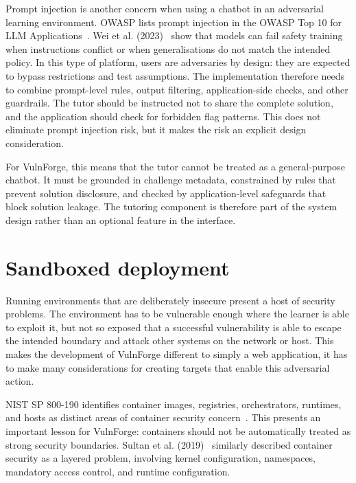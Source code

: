 Prompt injection is another concern when using a chatbot in an adversarial learning environment. OWASP lists prompt injection in the OWASP Top 10 for LLM Applications~\citep{editor_owasp_nodate}. Wei et al. (2023)~\citep{wei_jailbroken_2023} show that models can fail safety training when instructions conflict or when generalisations do not match the intended policy. In this type of platform, users are adversaries by design: they are expected to bypass restrictions and test assumptions. The implementation therefore needs to combine prompt-level rules, output filtering, application-side checks, and other guardrails. The tutor should be instructed not to share the complete solution, and the application should check for forbidden flag patterns. This does not eliminate prompt injection risk, but it makes the risk an explicit design consideration.

For VulnForge, this means that the tutor cannot be treated as a general-purpose chatbot. It must be grounded in challenge metadata, constrained by rules that prevent solution disclosure, and checked by application-level safeguards that block solution leakage. The tutoring component is therefore part of the system design rather than an optional feature in the interface.

\section{Sandboxed deployment}\label{sec:sandboxed}
Running environments that are deliberately insecure present a host of security problems. The environment has to be vulnerable enough where the learner is able to exploit it, but not so exposed that a successful vulnerability is able to escape the intended boundary and attack other systems on the network or host. This makes the development of VulnForge different to simply a web application, it has to make many considerations for creating targets that enable this adversarial action.

NIST SP 800-190 identifies container images, registries, orchestrators, runtimes, and hosts as distinct areas of container security concern~\citep{souppaya_application_2017}. This presents an important lesson for VulnForge: containers should not be automatically treated as strong security boundaries. Sultan et al. (2019)~\citep{noauthor_pdf_nodate} similarly described container security as a layered problem, involving kernel configuration, namespaces, mandatory access control, and runtime configuration.

